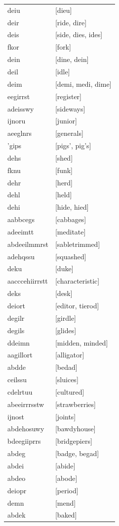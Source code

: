 \documentclass{article}
\begin{document}
\begin{tabular}{ll}
deiu & [dieu] \\
deir & [ride, dire] \\
deis & [side, dies, ides] \\
fkor & [fork] \\
dein & [dine, dein] \\
deil & [idle] \\
deim & [demi, medi, dime] \\
eegirrst & [register] \\
adeisswy & [sideways] \\
ijnoru & [junior] \\
aeeglnrs & [generals] \\
'gips & [pigs', pig's] \\
dehs & [shed] \\
fknu & [funk] \\
dehr & [herd] \\
dehl & [held] \\
dehi & [hide, hied] \\
aabbcegs & [cabbages] \\
adeeimtt & [meditate] \\
abdeeilmmrst & [sabletrimmed] \\
adehqssu & [squashed] \\
deku & [duke] \\
aacccehiirrstt & [characteristic] \\
deks & [desk] \\
deiort & [editor, tierod] \\
degilr & [girdle] \\
degils & [glides] \\
ddeimn & [midden, minded] \\
aagillort & [alligator] \\
abdde & [bedad] \\
ceilssu & [sluices] \\
cdelrtuu & [cultured] \\
abeeirrrsstw & [strawberries] \\
ijnost & [joints] \\
abdehosuwy & [bawdyhouse] \\
bdeegiiprrs & [bridgepiers] \\
abdeg & [badge, begad] \\
abdei & [abide] \\
abdeo & [abode] \\
deiopr & [period] \\
demn & [mend] \\
abdek & [baked] \\

\end{tabular}
\end{document}
